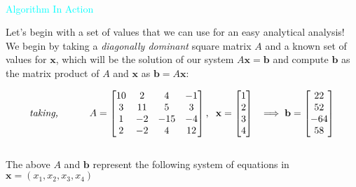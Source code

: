 \documentclass[main]{subfiles}
\begin{document}
    
    \noindent{\Huge \textcolor{teal}{SIMULATION}}\\
    {\large \textcolor{cyan}{Algorithm In Action}}\\
    \vspace{15mm}

    \noindent Let's begin with a set of values that we can use for an easy analytical analysis!
        We begin by taking a \textit{diagonally dominant} square matrix $A$ and a known set of values for 
        $\textbf{x}$, which will be the solution of our system $A\textbf{x} = \textbf{b}$ and compute
        $\textbf{b}$ as the matrix product of $A$ and $\textbf{x}$ as $\textbf{b} = A\textbf{x}$:

        \begin{equation}   
            \textit{taking, } \hspace{10mm} A = \begin{bmatrix}
                10 & 2 & 4 & -1 \\
                3 & 11 & 5 & 3 \\
                1 & -2 & -15 &-4 \\
                2 & -2 & 4 & 12 
            \end{bmatrix},\hspace{2mm}
            \textbf{x} = \begin{bmatrix}
                1 \\
                2 \\
                3 \\
                4 \\
            \end{bmatrix}
            \hspace{2mm}
        \implies \textbf{b} = \begin{bmatrix}
                22 \\
                52 \\
                -64\\
                58 \\
            \end{bmatrix}
        \end{equation}
\vspace{10mm}
\\
The above $A$ and $\textbf{b}$ represent the following system of equations in $\textbf{x} = (x_1, x_2, x_3, x_4)$  
\end{document}

